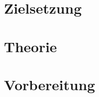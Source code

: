 


\section{Zielsetzung}
\label{sec:Theorie}

\section{Theorie}

\section{Vorbereitung}
\cite{sample}

